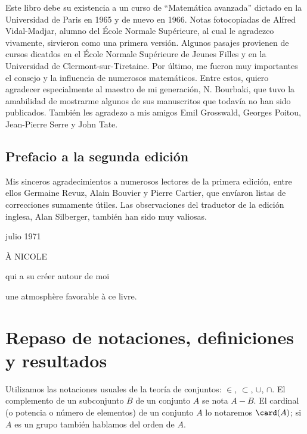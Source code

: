 \documentclass[bibtotoc,leqno,spanish]{amsbook}
\numberwithin{equation}{section}
\theoremstyle{note}
\theoremstyle{note}
\theoremstyle{rem}
\numberwithin{theorem}{section}
\numberwithin{proposition}{section}
\numberwithin{definition}{section}
\numberwithin{lemma}{section}
\numberwithin{corollary}{section}
\numberwithin{example}{section}
\numberwithin{footnote}{section}%
\begin{document}
Este libro debe su existencia a un curso de ``Matem\'atica avanzada''
dictado en la Universidad de Paris en 1965 y de nuevo en 1966.
Notas fotocopiadas de {Alfred Vidal-Madjar,} alumno del \'Ecole
Normale Sup\'erieure, al cual le agradezco vivamente, sirvieron
como una primera versi\'on. Algunos pasajes provienen de cursos dicatdos
en el \'Ecole Normale Sup\'erieure de Jeunes Filles y en la Universidad
de Clermont-sur-Tiretaine. Por \'ultimo, me fueron muy importantes el consejo
y la influencia de numerosos matem\'aticos. Entre estos, quiero agradecer
especialmente al maestro de mi generaci\'on, {N. Bourbaki,} que tuvo la
amabilidad de mostrarme algunos de sus manuscritos que todav\'ia no han sido
publicados. Tambi\'en les agradezo a mis amigos {Emil Grosswald,} {Georges
Poitou,} {Jean-Pierre Serre} y {John Tate.}

\section*{Prefacio a la segunda edici\'on}

Mis sinceros agradecimientos a numerosos lectores de la primera
edici\'on, entre ellos Germaine Revuz, Alain Bouvier y Pierre Cartier,
que env\'iaron listas de correcciones sumamente \'utiles. Las observaciones
del traductor de la edici\'on inglesa, Alan Silberger, tambi\'en han sido
muy valiosas.

\begin{flushright}
julio 1971
\end{flushright}

{
  \newpage
  \thispagestyle{empty}
  \itshape
  \hspace{0pt}\vfill
  \begin{flushright}
    \`A NICOLE

    qui a su cr\'eer autour de moi

    une atmosph\`ere favorable \`a ce livre.
  \end{flushright}
  \vfill
}

\chapter*{Repaso de notaciones, definiciones y resultados}

Utilizamos las notaciones usuales de la teor\'ia de conjuntos:
$\in$, $\subset$, $\cup$, $\cap$.
El complemento de un subconjunto $B$ de un conjunto $A$ se nota $A - B$.
El cardinal (o potencia o n\'umero de elementos) de un conjunto $A$ lo notaremos
$\card(A)$; si $A$ es un grupo tambi\'en hablamos del orden de $A$.
\end{document}
